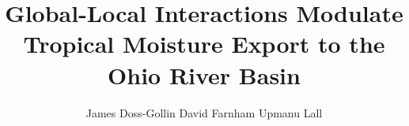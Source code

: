 \documentclass[serif,mathserif,final]{beamer}
\title{Global-Local Interactions Modulate Tropical Moisture Export to the Ohio River Basin}
\author{James Doss-Gollin\inst{1,2} \quad David Farnham\inst{1,2} \quad Upmanu Lall\inst{1,2}}
\institute
{\inst{1} Columbia Water Center \quad \inst{2} Department of Earth and Environmental Engineering, Columbia University}
\begin{document}
\def\ci{\perp\!\!\!\perp}
\def\ex{\mathbb{E}}
\def\prob{\mathbb{P}}
\def\ind{\mathbb{I}}
\def\grad{\triangledown}
\def\bigo{\mathcal{O}}
\def\normal{\mathcal{N}}
\def\bern{\text{Bernoulli}}
\def\logit{\text{logit}}
\def\binom{\text{Bin}}
\def\poiss{\text{Poiss}}
\def\cauchy{\text{Cauchy}}
\def\sigmoid{\vb{\sigma}}
\def\given{\big|}
\def\stan{\texttt{Stan~}}

\end{document}
